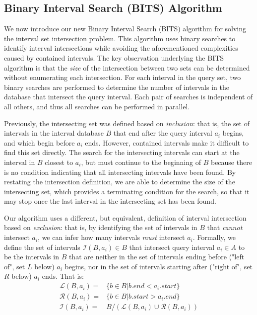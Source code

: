 \documentclass{bioinfo}
\begin{document}
        
\subsection{Binary Interval Search (BITS) Algorithm}
We now introduce our new Binary Interval Search (BITS) algorithm for solving the
interval set intersection problem.  This algorithm uses binary searches to
identify interval intersections while avoiding the aforementioned complexities
caused by contained intervals. The key observation underlying the BITS algorithm
is that the \emph{size} of the intersection between two sets can be determined
without enumerating each intersection.  For each interval in the query set, two
binary searches are performed to determine the number of intervals in the
database that intersect the query interval.  Each pair of searches is
independent of all others, and thus all searches can be performed in parallel.  

Previously, the intersecting set was defined based on \emph{inclusion}: that is,
the set of intervals in the interval database $B$ that end after the query
interval $a_i$ begins, and which begin before $a_i$ ends.  However, contained
intervals make it difficult to find this set directly.  The search for the
intersecting intervals can start at the interval in $B$ closest to $a_i$, but
must continue to the beginning of $B$ because there is no condition indicating
that all intersecting intervals have been found.  By restating the intersection
definition, we are able to determine the size of the intersecting set, which
provides a terminating condition for the search, so that it may stop once the
last interval in the intersecting set has been found.

Our algorithm uses a different, but equivalent, definition of interval
intersection based on \emph{exclusion}: that is, by identifying the set of
intervals in $B$ that \emph{cannot} intersect $a_i$, we can infer how many
intervals \emph{must} intersect $a_i$. Formally, we define the set of intervals
$\mathcal{I}(B,a_i) \in B$ that intersect query interval $a_i\in A$ to be the
intervals in $B$ that are neither in the set of intervals ending before ("left
of", set $L$ below) $a_i$ begins, nor in the set of intervals starting after
("right of", set $R$ below) $a_i$ ends.  That is:
\begin{equation*}
	\begin{split}
		\mathcal{L}(B,a_i) = &\{b\in B| b.end < a_i.start\} \\
		\mathcal{R}(B,a_i) = &\{b\in B| b.start > a_i.end\} \\
		\mathcal{I}(B,a_i) = &B / (\mathcal{L}(B,a_i) \cup \mathcal{R}(B,a_i))
	\end{split}
\end{equation*}
\end{document}
